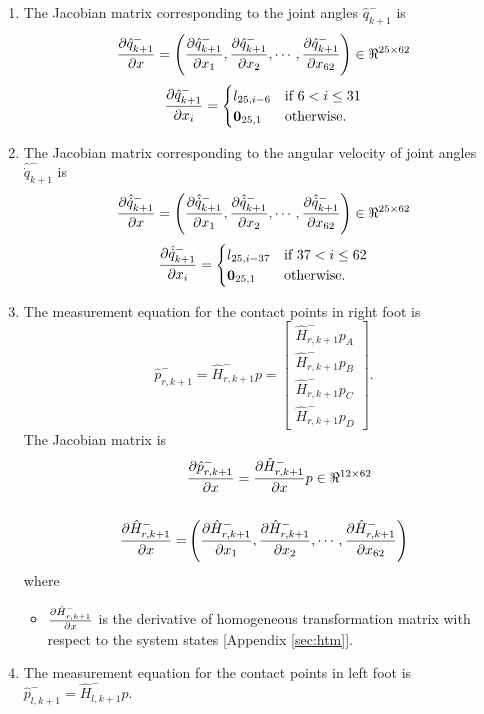 \begin{enumerate}
\item The Jacobian matrix corresponding to the joint angles $\hat{q}_{k+1}^-$ is
\begin{equation}
\label{eq:dq_msrdx}
\frac{\partial {\hat{q}_{k+1}^-}}{\partial {x}} = \left(\frac{\partial {\hat{q}_{k+1}^-}}{\partial {x_{1}}}, \frac{\partial {\hat{q}_{k+1}^-}}{\partial {x_{2}}}, \cdots , \frac{\partial {\hat{q}_{k+1}^-}}{\partial {x_{62}}}\right) \in \Re^{25 \times 62}
\end{equation}
 \[
 \frac{\partial {\hat{q}_{k+1}^-}}{\partial {x_{i}}} =
 \begin{cases}
 l_{25,i-6} & \text{if } 6 < i \leq 31 \\
 \textbf{0}_{25,1} & \text{otherwise}.
 \end{cases}
 \]

\item The Jacobian matrix corresponding to the angular velocity of joint angles  $\hat{\dot{q}}_{k+1}^-$ is 
\begin{equation}
 \label{eq:ddq_msrdx}
\frac{\partial {\hat{\dot{q}}_{k+1}^-}}{\partial {x}} = \left(\frac{\partial {\hat{\dot{q}}_{k+1}^-}}{\partial {x_{1}}}, \frac{\partial {\hat{\dot{q}}_{k+1}^-}}{\partial {x_{2}}}, \cdots , \frac{\partial {\hat{\dot{q}}_{k+1}^-}}{\partial {x_{62}}}\right) \in \Re^{25 \times 62}
\end{equation}
  \[
 \frac{\partial {\hat{\dot{q}}_{k+1}^-}}{\partial {x_{i}}} =
 \begin{cases}
 l_{25,i-37} & \text{if } 37 < i \leq 62 \\
 \textbf{0}_{25,1} & \text{otherwise}.
 \end{cases}
 \]

 \item The measurement equation for the contact points in right foot is $$\hat{p}_{r,k+1}^- = \hat{H}_{r,k+1}^- p = \begin{bmatrix} \hat{H}_{r,k+1}^- p_{A}\\ \hat{H}_{r,k+1}^- p_{B}\\ \hat{H}_{r,k+1}^- p_{C}\\ \hat{H}_{r,k+1}^- p_{D}\end{bmatrix}.$$
 The Jacobian matrix is 
\begin{equation}
    \label{eq:dpr_msrdx}
    \begin{split}
    &\dfdx{\hat{p}_{r,k+1}^-}{x} = \dfdx{\hat{H}_{r,k+1}^-}{x}p\in \Re^{12 \times 62}
 \\ \vspace{1cm} \\
     \dfdx{\hat{H}_{r,k+1}^-}{x} = &\left( \dfdx{\hat{H}_{r,k+1}^-}{x_1}, \dfdx{\hat{H}_{r,k+1}^-}{x_2},\cdots, \dfdx{\hat{H}_{r,k+1}^-}{x_{62}} \right)     
     \end{split}
\end{equation}where
\begin{itemize}
     \item $\frac{\partial {\hat{H}_{r,k+1}^-}}{\partial {x}}$ is the derivative of homogeneous transformation matrix with respect to the system states [Appendix \ref{sec:htm}].
\end{itemize}
 \item The measurement equation for the contact points in left foot is  $\hat{p}_{l,k+1}^- = \hat{H}_{l,k+1}^- p$.


\end{enumerate}

